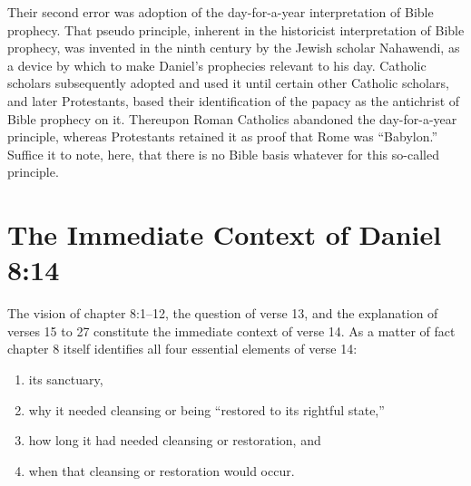 Their second error was adoption of the day-for-a-year interpretation of
Bible prophecy. That pseudo principle, inherent in the historicist
interpretation of Bible prophecy, was invented in the ninth century by the
Jewish scholar Nahawendi, as a device by which to make Daniel's prophecies
relevant to his day. Catholic scholars subsequently adopted and used it
until certain other Catholic scholars, and later Protestants, based
their identification of the papacy as the antichrist of Bible prophecy on
it. Thereupon Roman Catholics abandoned the day-for-a-year principle,
whereas Protestants retained it as proof that Rome was ``Babylon.'' Suffice it
to note, here, that there is no Bible basis whatever for this so-called
principle.

\section{The Immediate Context of Daniel 8:14}

The vision of chapter 8:1--12, the question of verse 13, and the explanation
of verses 15 to 27 constitute the immediate context of verse 14. As a matter
of fact chapter 8 itself identifies all four essential elements of verse 14:
\begin{enumerate}
	\item its sanctuary, 
	\item why it needed cleansing or being ``restored to its
rightful state,'' 
	\item how long it had needed cleansing or restoration, and
	\item when that cleansing or restoration would occur.
\end{enumerate}

